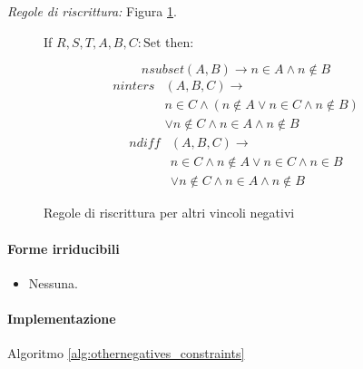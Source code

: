 \documentclass[12pt,a4paper,openright]{book} %
\begin{document}
\noindent\textit{Regole di riscrittura:} Figura \ref{fig:othernegatives_constraints}.

\begin{figure}
	\begin{tcolorbox}[colframe=black, colback=white, sharp corners]
		\setcounter{equation}{0}
		\renewcommand{\theequation}{\arabic{equation}}

		If $R, S, T, A, B, C: \text{Set}$ then:

		\begin{equation}
		nsubset(A,B) \to n \in A \land n \not\in B
		\end{equation}
		\begin{equation}
		\begin{split}
		ninters& (A,B,C) \to \\
		  & n \in C \land ( n \not\in A \lor n \in C \land n \not\in B ) \\
		  & \lor n \not\in C \land n \in A \land n \not\in B
		\end{split}
		\end{equation}
		\begin{equation}
		\begin{split}
		ndiff& (A,B,C) \to \\
		  & n \in C \land n \not\in A \lor n \in C \land n \in B \\
		  & \lor n \not\in C \land n \in A \land n \not\in B
		\end{split}
		\end{equation}

	\end{tcolorbox}

	\caption{Regole di riscrittura per altri vincoli negativi}
	\label{fig:othernegatives_constraints}
\end{figure}

\paragraph{Forme irriducibili}
\begin{itemize}
	\item Nessuna.
\end{itemize}

\paragraph{Implementazione}
Algoritmo \ref{alg:othernegatives_constraints}
\end{document}
